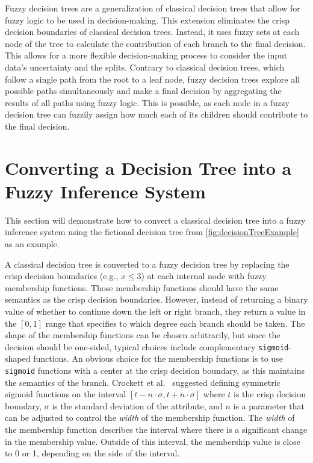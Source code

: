 Fuzzy decision trees are a generalization of classical decision trees that allow for fuzzy logic to be used in decision-making. This extension eliminates the crisp decision boundaries of classical decision trees. Instead, it uses fuzzy sets at each node of the tree to calculate the contribution of each branch to the final decision. This allows for a more flexible decision-making process to consider the input data's uncertainty and the splits. Contrary to classical decision trees, which follow a single path from the root to a leaf node, fuzzy decision trees explore all possible paths simultaneously and make a final decision by aggregating the results of all paths using fuzzy logic. This is possible, as each node in a fuzzy decision tree can fuzzily assign how much each of its children should contribute to the final decision.

\section{Converting a Decision Tree into a Fuzzy Inference System}


This section will demonstrate how to convert a classical decision tree into a fuzzy inference system using the fictional decision tree from \autoref{fig:decisionTreeExample} as an example.

A classical decision tree is converted to a fuzzy decision tree by replacing the crisp decision boundaries (e.g., $x \leq 3$) at each internal node with fuzzy membership functions. Those membership functions should have the same semantics as the crisp decision boundaries. However, instead of returning a binary value of whether to continue down the left or right branch, they return a value in the $[0,1]$ range that specifies to which degree each branch should be taken. The shape of the membership functions can be chosen arbitrarily, but since the decision should be one-sided, typical choices include complementary \texttt{sigmoid}-shaped functions.
An obvious choice for the membership functions is to use \texttt{sigmoid} functions with a center at the crisp decision boundary, as this maintains the semantics of the branch. Crockett et al.~\cite{CROCKETT20062809} suggested defining symmetric sigmoid functions on the interval $[t-n\cdot \sigma, t+n\cdot \sigma]$ where $t$ is the crisp decision boundary, $\sigma$ is the standard deviation of the attribute, and $n$ is a parameter that can be adjusted to control the \emph{width} of the membership function. The \emph{width} of the membership function describes the interval where there is a significant change in the membership value. Outside of this interval, the membership value is close to 0 or 1, depending on the side of the interval.

